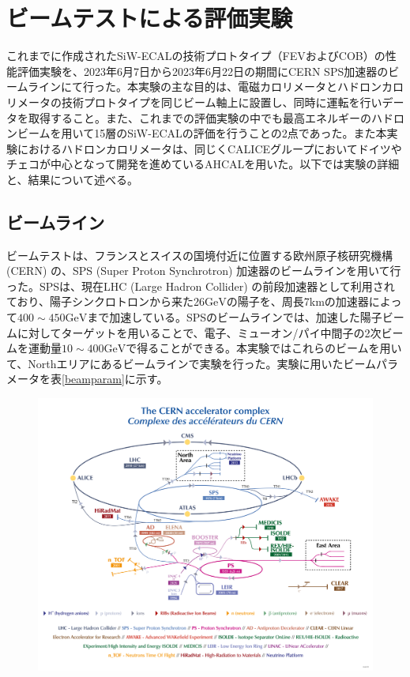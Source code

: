
\chapter{ビームテストによる評価実験} \label{sec:Beamtest}
これまでに作成されたSiW-ECALの技術プロトタイプ（FEVおよびCOB）の性能評価実験を、2023年6月7日から2023年6月22日の期間にCERN SPS加速器のビームラインにて行った。本実験の主な目的は、電磁カロリメータとハドロンカロリメータの技術プロトタイプを同じビーム軸上に設置し、同時に運転を行いデータを取得すること。また、これまでの評価実験の中でも最高エネルギーのハドロンビームを用いて15層のSiW-ECALの評価を行うことの2点であった。また本実験におけるハドロンカロリメータは、同じくCALICEグループにおいてドイツやチェコが中心となって開発を進めているAHCALを用いた。以下では実験の詳細と、結果について述べる。
\section{ビームライン}
ビームテストは、フランスとスイスの国境付近に位置する欧州原子核研究機構 (CERN) の、SPS (Super Proton Synchrotron) 加速器のビームラインを用いて行った。SPSは、現在LHC (Large Hadron Collider) の前段加速器として利用されており、陽子シンクロトロンから来た26$\mathrm{GeV}$の陽子を、周長7kmの加速器によって$400\sim 450 \mathrm{GeV}$まで加速している。SPSのビームラインでは、加速した陽子ビームに対してターゲットを用いることで、電子、ミューオン/パイ中間子の2次ビームを運動量$10\sim 400 \mathrm{GeV}$で得ることができる。本実験ではこれらのビームを用いて、Northエリアにあるビームラインで実験を行った。実験に用いたビームパラメータを表\ref{beamparam}に示す。\\
\begin{figure}[H]
 \begin{minipage}[h]{0.45\linewidth}
	\begin{center}
 \includegraphics[keepaspectratio, scale=0.3]
 	{Figure/Beamtest/cern.png}
 		\caption{}
	\end{center}
 \end{minipage}
\end{figure}
